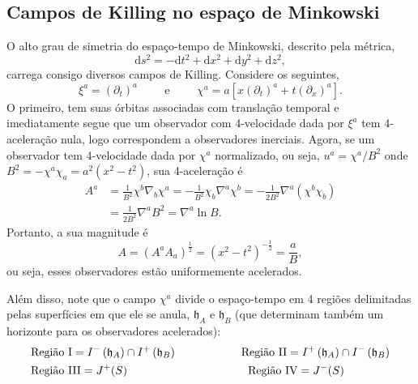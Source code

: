 \documentclass[12pt]{article}
\newcommand{\dd}{\mathrm{d}}
\begin{document}
\subsection*{Campos de Killing no espaço de Minkowski}
O alto grau de simetria do espaço-tempo de Minkowski, descrito pela métrica,
\begin{equation}
    \dd s^2=-\dd t^2+\dd x^2+\dd y^2+\dd z^2,
\end{equation}
carrega consigo diversos campos de Killing. Considere os seguintes,
\begin{equation}
    \xi^a=\left(\partial_t\right)^a\hspace{1cm}\text{e}\hspace{1cm}\chi^a=a\left[x\left(\partial_t\right)^a+t\left(\partial_x\right)^a\right].
\end{equation}
O primeiro, tem suas órbitas associadas com translação temporal e imediatamente segue que um observador com 4-velocidade dada por \(\xi^a\) tem 4-aceleração nula, logo correspondem a observadores inerciais. Agora, se um observador tem 4-velocidade dada por \(\chi^a\) normalizado, ou seja, \(u^a=\chi^a/B^2\) onde \(B^2=-\chi^a\chi_a=a^2(x^2-t^2)\), sua 4-aceleração é
\begin{subequations}
    \begin{align}
        A^a&=\frac{1}{B^2}\chi^b\nabla_b\chi^a=-\frac{1}{B^2}\chi_b\nabla^a\chi^b=-\frac{1}{2B^2}\nabla^a\left(\chi^b\chi_b\right)\\
        &=\frac{1}{2B^2}\nabla^aB^2=\nabla^a\ln{B}.
    \end{align}
\end{subequations}
Portanto, a sua magnitude é
\begin{equation}
    A=\left(A^aA_a\right)^{\frac{1}{2}}=(x^2-t^2)^{-\frac{1}{2}}=\frac{a}{B},
\end{equation}
ou seja, esses observadores estão uniformemente acelerados. 

Além disso, note que o campo \(\chi^a\) divide o espaço-tempo em 4 regiões delimitadas pelas superfícies em que ele se anula, \(\mathfrak{h}_A\) e \(\mathfrak{h}_B\) (que determinam também um horizonte para os observadores acelerados):
\begin{equation}
    \begin{aligned}
        &\text{Região I}=I^-\left(\mathfrak{h}_A\right)\cap I^+\left(\mathfrak{h}_B\right)\hspace{2cm}\text{Região II}=I^+\left(\mathfrak{h}_A\right)\cap I^-\left(\mathfrak{h}_B\right)\\
        &\text{Região III}=J^+(S)\hspace{3.75cm}\text{Região IV}=J^-(S)
    \end{aligned}
\end{equation}
\end{document}
